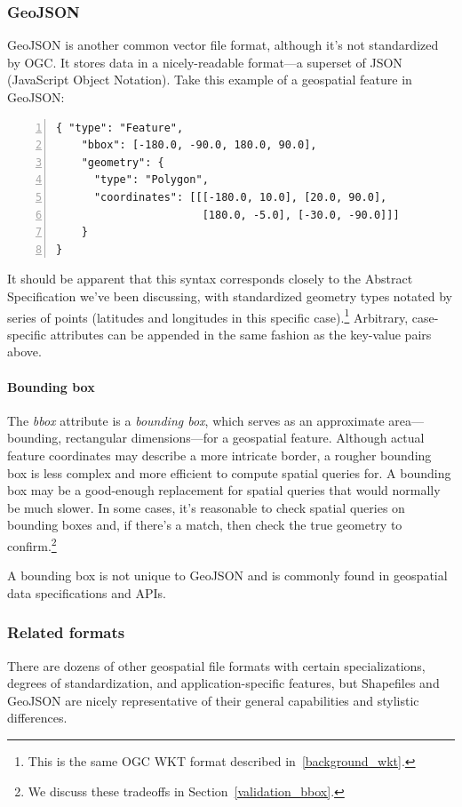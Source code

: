 \subsubsection{GeoJSON}
GeoJSON is another common vector file format, although it's not standardized by OGC. It stores data in a nicely-readable format---a superset of JSON (JavaScript Object Notation). Take this example of a geospatial feature in GeoJSON:

\begin{Verbatim}[samepage=true,baselinestretch=1,numbers=left,xleftmargin=12mm]
{ "type": "Feature",
    "bbox": [-180.0, -90.0, 180.0, 90.0],
    "geometry": {
      "type": "Polygon",
      "coordinates": [[[-180.0, 10.0], [20.0, 90.0],
                       [180.0, -5.0], [-30.0, -90.0]]]
    }
}
\end{Verbatim}

It should be apparent that this syntax corresponds closely to the Abstract Specification we've been discussing, with standardized geometry types notated by series of points (latitudes and longitudes in this specific case).\footnote{This is the same OGC WKT format described in~\ref{background_wkt}.} Arbitrary, case-specific attributes can be appended in the same fashion as the key-value pairs above.

\paragraph{Bounding box}
The \textit{bbox} attribute is a \textit{bounding box}, which serves as an approximate area---bounding, rectangular dimensions---for a geospatial feature. Although actual feature coordinates may describe a more intricate border, a rougher bounding box is less complex and more efficient to compute spatial queries for. A bounding box may be a good-enough replacement for spatial queries that would normally be much slower. In some cases, it's reasonable to check spatial queries on bounding boxes and, if there's a match, then check the true geometry to confirm.\footnote{We discuss these tradeoffs in Section~\ref{validation_bbox}.}

A bounding box is not unique to GeoJSON and is commonly found in geospatial data specifications and APIs.

\subsubsection{Related formats}
There are dozens of other geospatial file formats with certain specializations, degrees of standardization, and application-specific features, but Shapefiles and GeoJSON are nicely representative of their general capabilities and stylistic differences.